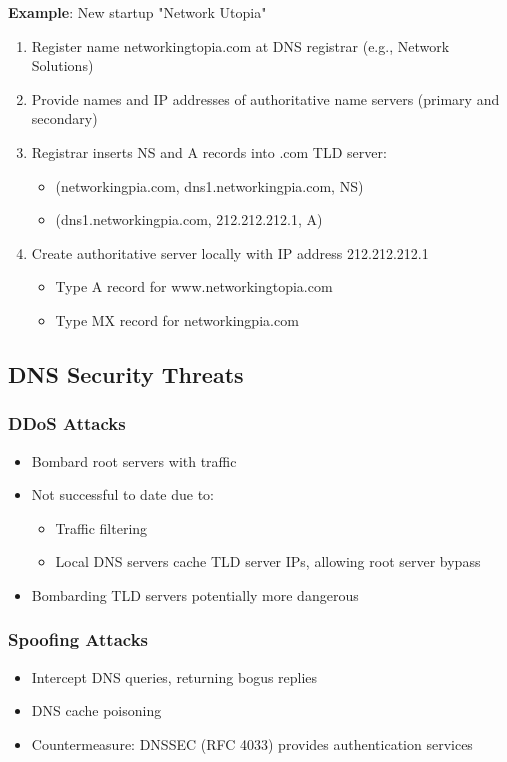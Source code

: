 \documentclass[12pt]{article}
\begin{document}
\textbf{Example}: New startup "Network Utopia"

\begin{enumerate}
    \item Register name networkingtopia.com at DNS registrar (e.g., Network Solutions)
    \item Provide names and IP addresses of authoritative name servers (primary and secondary)
    \item Registrar inserts NS and A records into .com TLD server:
          \begin{itemize}
              \item (networkingpia.com, dns1.networkingpia.com, NS)
              \item (dns1.networkingpia.com, 212.212.212.1, A)
          \end{itemize}
    \item Create authoritative server locally with IP address 212.212.212.1
          \begin{itemize}
              \item Type A record for www.networkingtopia.com
              \item Type MX record for networkingpia.com
          \end{itemize}
\end{enumerate}

\subsection{DNS Security Threats}
\subsubsection{DDoS Attacks}
\begin{itemize}
    \item Bombard root servers with traffic
    \item Not successful to date due to:
          \begin{itemize}
              \item Traffic filtering
              \item Local DNS servers cache TLD server IPs, allowing root server bypass
          \end{itemize}
    \item Bombarding TLD servers potentially more dangerous
\end{itemize}

\subsubsection{Spoofing Attacks}
\begin{itemize}
    \item Intercept DNS queries, returning bogus replies
    \item DNS cache poisoning
    \item Countermeasure: DNSSEC (RFC 4033) provides authentication services
\end{itemize}
\end{document}
